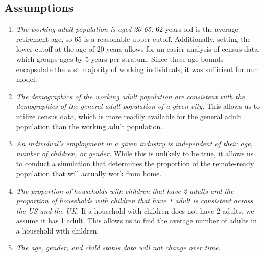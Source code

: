 \documentclass{article}
\begin{document}
\subsection{Assumptions}
\begin{enumerate}
    \item \textit{The working adult population is aged 20-65.} 62 years old is the average retirement age, so 65 is a reasonable upper cutoff\cite{loriekonish_2022}. Additionally, setting the lower cutoff at the age of 20 years allows for an easier analysis of census data, which groups ages by 5 years per stratum. Since these age bounds encapsulate the vast majority of working individuals, it was sufficient for our model. 
    \item \textit{The demographics of the working adult population are consistent with the demographics of the general adult population of a given city.} This allows us to utilize census data, which is more readily available for the general adult population than the working adult population.
    \item \textit{An individual’s employment in a given industry is independent of their age, number of children, or gender.} While this is unlikely to be true, it allows us to conduct a simulation that determines the proportion of the remote-ready population that will actually work from home.
    \item \textit{The proportion of households with children that have 2 adults and the proportion of households with children that have 1 adult is consistent across the US and the UK.} If a household with children does not have 2 adults, we assume it has 1 adult. This allows us to find the average number of adults in a household with children.
    \item \textit{The age, gender, and child status data will not change over time.}

\end{enumerate}
\
\end{document}
